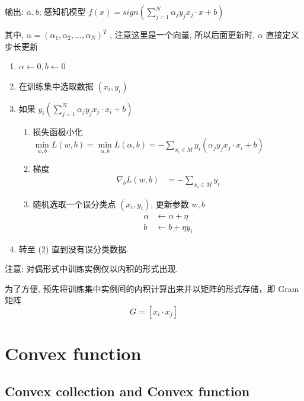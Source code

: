 \documentclass[oneside, 12pt]{ctexbook}
\begin{document}
			输出: $\alpha, b$; 感知机模型 $f(x) = sign \left( \sum\limits_{j=1}^{N} \alpha_j y_j x_j \cdot x + b \right) $
			
			其中, $\alpha = (\alpha_1, \alpha_2, ..., \alpha_N)^T$ , 注意这里是一个向量, 所以后面更新时, $\alpha$ 直接定义步长更新
			
			\begin{enumerate}
				\item $\alpha \leftarrow 0, b \leftarrow 0$
				
				\item 在训练集中选取数据 $(x_i, y_i)$
				
				\item 如果 $y_i \left( \sum\limits_{j=1}^{N} \alpha_j y_j x_j \cdot x_i + b \right)$
					\begin{enumerate}
						\item 损失函极小化 $\underset{w,b}{\min}L(w, b) = \underset{\alpha,b}{\min}L(\alpha, b) = -\sum\limits_{x_i \in M} y_i (\alpha_j y_j x_j \cdot x_i + b)$
						
						\item 梯度
						\begin{align}
						\nabla_b L(w, b) &= -\sum_{x_i \in M} y_i
						\end{align}
						
						\item 随机选取一个误分类点 $(x_i, y_i)$, 更新参数 $w, b$
						\begin{align}
						\alpha &\leftarrow \alpha + \eta \\
						b &\leftarrow b + \eta y_i
						\end{align}
					\end{enumerate}
				
				\item 转至 (2) 直到没有误分类数据.
			\end{enumerate}
			
			注意: 对偶形式中训练实例仅以内积的形式出现.
			
			为了方便, 预先将训练集中实例间的内积计算出来并以矩阵的形式存储，即 Gram 矩阵
			\begin{equation}
				G = \left[ x_i \cdot x_j \right]
			\end{equation}
		
	\chapter{\quad Convex function}
		\thispagestyle{fancy}
		\section{\quad Convex collection and Convex function}
\end{document}
